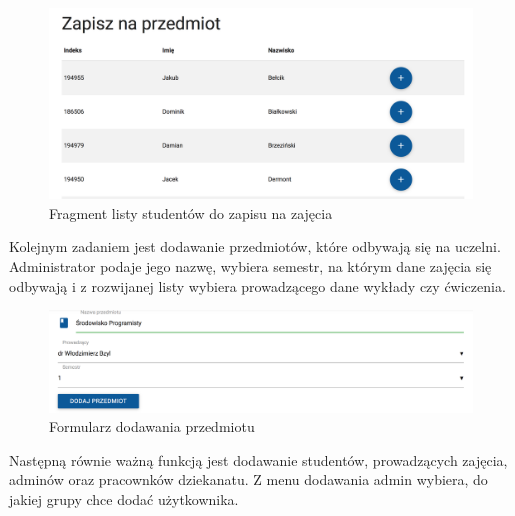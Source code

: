 \documentclass{xmgr}
\begin{document}
\begin{figure}[th!]
\centering
\includegraphics[width=1.1\hsize]{images/addStudent}
\caption{Fragment listy studentów do zapisu na zajęcia\label{RYS.5}}
\end{figure}

\noindent Kolejnym zadaniem jest dodawanie przedmiotów, które odbywają się na uczelni. Administrator podaje jego nazwę, wybiera semestr, na którym dane zajęcia się odbywają i z rozwijanej listy wybiera prowadzącego dane wykłady czy ćwiczenia.

\begin{figure}[th!]
\centering
\includegraphics[width=1.1\hsize]{images/addSubject}
\caption{Formularz dodawania przedmiotu\label{RYS.6}}
\end{figure}

\newpage

\noindent Następną równie ważną funkcją jest dodawanie studentów, prowadzących zajęcia, adminów oraz pracownków dziekanatu. Z menu dodawania admin wybiera, do jakiej grupy chce dodać użytkownika.
\end{document}
